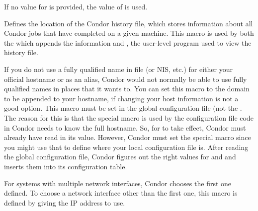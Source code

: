 \begin{description}
  If no value for  is provided, the value of 
  is used.


\item[\Macro{HISTORY}] \label{param:History} Defines the
  location of the Condor history file, which stores information about
  all Condor jobs that have completed on a given machine.  This macro
  is used by both the  which appends the information
  and , the user-level program used to view
  the history file.

\item[\Macro{DEFAULT\_DOMAIN\_NAME}] \label{param:DefaultDomainName}
  If you do not use a fully qualified name in file 
  (or NIS, etc.) for either your official hostname or as an
  alias, Condor would not normally be able to use fully qualified names
  in places that it wants to.  You can set this macro to the
  domain to be appended to your hostname, if changing your host
  information is not a good option.  This macro must be set in the
  global configuration file (not the .
  The reason for this is that the special 
  macro is used by the configuration file code in Condor needs
  to know the full hostname.  So, for  to
  take effect, Condor must already have read in its value.  However,
  Condor must set the  special macro since you
  might use that to define where your local configuration file is.  After
  reading the global configuration file, Condor figures out the right values
  for  and  and inserts them
  into its configuration table.

\item[\Macro{NETWORK\_INTERFACE}] \label{param:NetworkInterface}
  For systems with multiple network interfaces, Condor chooses the
  first one defined.  To choose a network interface other than the
  first one, this macro is defined by giving the IP address
  to use.


\end{description}
